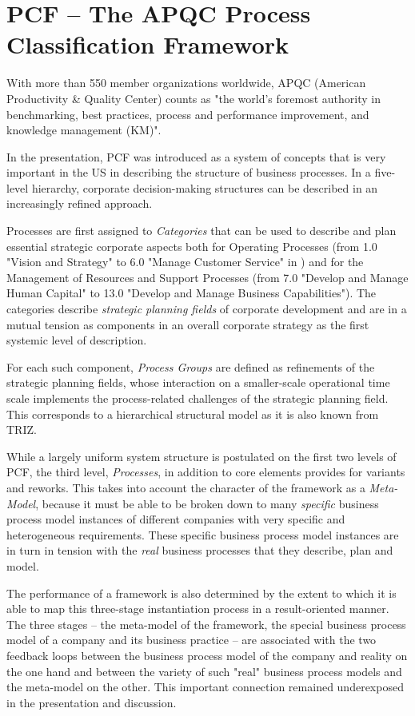 \documentclass[11pt,a4paper]{article}
\begin{document}
\section{PCF -- The APQC Process Classification Framework}

With more than 550 member organizations worldwide, APQC (American Productivity
\& Quality Center) counts as "the world’s foremost authority in benchmarking,
best practices, process and performance improvement, and knowledge management
(KM)".

In the presentation, PCF \cite{APQC-PCF} was introduced as a system of
concepts that is very important in the US in describing the structure of
business processes. In a five-level hierarchy, corporate decision-making
structures can be described in an increasingly refined approach.

Processes are first assigned to \emph{Categories} that can be used to describe
and plan essential strategic corporate aspects both for Operating Processes
(from 1.0 "Vision and Strategy" to 6.0 "Manage Customer Service" in
\cite{APQC-PCF}) and for the Management of Resources and Support Processes
(from 7.0 "Develop and Manage Human Capital" to 13.0 "Develop and Manage
Business Capabilities"). The categories describe \emph{strategic planning
  fields} of corporate development and are in a mutual tension as components
in an overall corporate strategy as the first systemic level of description.

For each such component, \emph{Process Groups} are defined as refinements of
the strategic planning fields, whose interaction on a smaller-scale
operational time scale implements the process-related challenges of the
strategic planning field. This corresponds to a hierarchical structural model
as it is also known from TRIZ.

While a largely uniform system structure is postulated on the first two levels
of PCF, the third level, \emph{Processes}, in addition to core elements
provides for variants and reworks. This takes into account the character of
the framework as a \emph{Meta-Model}, because it must be able to be broken
down to many \emph{specific} business process model instances of different
companies with very specific and heterogeneous requirements. These specific
business process model instances are in turn in tension with the \emph{real}
business processes that they describe, plan and model.

The performance of a framework is also determined by the extent to which it is
able to map this three-stage instantiation process in a result-oriented
manner.  The three stages -- the meta-model of the framework, the special
business process model of a company and its business practice -- are
associated with the two feedback loops between the business process model of
the company and reality on the one hand and between the variety of such "real"
business process models and the meta-model on the other. This important
connection remained underexposed in the presentation and discussion.
\end{document}
